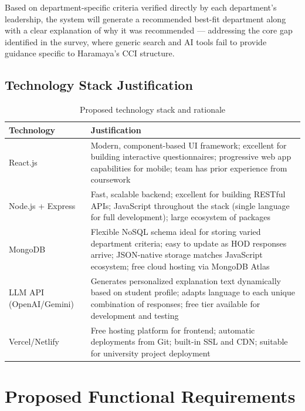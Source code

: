 \documentclass[12pt, a4paper]{article}
\begin{document}
Based on department-specific criteria verified directly by each department's leadership, the system will generate a recommended best-fit department along with a clear explanation of why it was recommended — addressing the core gap identified in the survey, where generic search and AI tools fail to provide guidance specific to Haramaya's CCI structure.

\subsection{Technology Stack Justification}

\begin{table}[H]
\centering
\begin{tabularx}{\textwidth}{lX}
\toprule
\textbf{Technology} & \textbf{Justification} \\
\midrule
React.js & Modern, component-based UI framework; excellent for building interactive questionnaires; progressive web app capabilities for mobile; team has prior experience from coursework \\[4pt]

Node.js + Express & Fast, scalable backend; excellent for building RESTful APIs; JavaScript throughout the stack (single language for full development); large ecosystem of packages \\[4pt]

MongoDB & Flexible NoSQL schema ideal for storing varied department criteria; easy to update as HOD responses arrive; JSON-native storage matches JavaScript ecosystem; free cloud hosting via MongoDB Atlas \\[4pt]

LLM API (OpenAI/Gemini) & Generates personalized explanation text dynamically based on student profile; adapts language to each unique combination of responses; free tier available for development and testing \\[4pt]

Vercel/Netlify & Free hosting platform for frontend; automatic deployments from Git; built-in SSL and CDN; suitable for university project deployment \\[4pt]
\bottomrule
\end{tabularx}
\caption{Proposed technology stack and rationale}
\end{table}

\section{Proposed Functional Requirements}
\label{sec:requirements}
\end{document}
